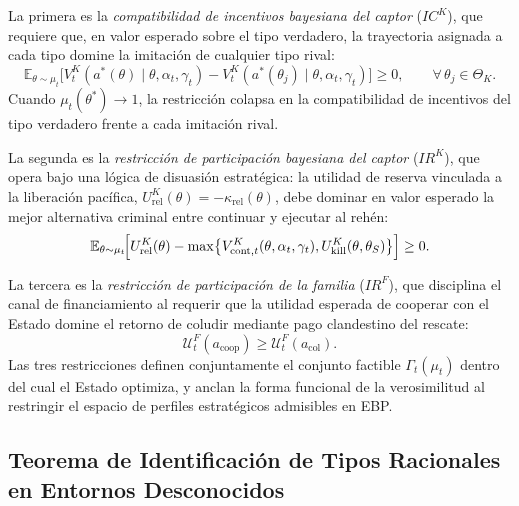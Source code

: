 \documentclass[pdflatex,sn-mathphys-ay]{sn-jnl}
\theoremstyle{thmstyleone}
\theoremstyle{thmstyletwo}
\theoremstyle{thmstylethree}
\newcommand{\E}{\mathbb{E}}
\newcommand{\ThetaK}{\Theta_K}
\newcommand{\1}{\mathbf{1}}
\begin{document}
La primera es la \emph{compatibilidad de incentivos bayesiana del captor} ($IC^K$), que requiere que, en valor esperado sobre el tipo verdadero, la trayectoria asignada a cada tipo domine la imitación de cualquier tipo rival:
\begin{equation}
\E_{\theta\sim\mu_t}\!\bigl[V^K_t(a^\ast(\theta)\mid\theta,\alpha_t,\gamma_t)-V^K_t(a^\ast(\theta_j)\mid\theta,\alpha_t,\gamma_t)\bigr]\ge 0,\qquad\forall\,\theta_j\in\ThetaK.
\label{eq:ic-kidnapper}
\end{equation}
Cuando $\mu_t(\theta^\ast)\to 1$, la restricción colapsa en la compatibilidad de incentivos del tipo verdadero frente a cada imitación rival.

La segunda es la \emph{restricción de participación bayesiana del captor} ($IR^K$), que opera bajo una lógica de disuasión estratégica: la utilidad de reserva vinculada a la liberación pacífica, $U^K_{\mathrm{rel}}(\theta)=-\kappa_{\mathrm{rel}}(\theta)$, debe dominar en valor esperado la mejor alternativa criminal entre continuar y ejecutar al rehén:
\begin{equation}
\E_{\theta\sim\mu_t}\!\Bigl[U^K_{\mathrm{rel}}(\theta)-\max\bigl\{V^K_{\mathrm{cont},t}(\theta,\alpha_t,\gamma_t),U^K_{\mathrm{kill}}(\theta,\theta_S)\bigr\}\Bigr]\ge 0.
\label{eq:ir-K}
\end{equation}

La tercera es la \emph{restricción de participación de la familia} ($IR^F$), que disciplina el canal de financiamiento al requerir que la utilidad esperada de cooperar con el Estado domine el retorno de coludir mediante pago clandestino del rescate:
\begin{equation}
\mathcal{U}^F_t(a_{\mathrm{coop}})\ge\mathcal{U}^F_t(a_{\mathrm{col}}).
\label{eq:ir-family}
\end{equation}
Las tres restricciones definen conjuntamente el conjunto factible $\Gamma_t(\mu_t)$ dentro del cual el Estado optimiza, y anclan la forma funcional de la verosimilitud al restringir el espacio de perfiles estratégicos admisibles en EBP.

\subsection{Teorema de Identificación de Tipos Racionales en Entornos Desconocidos}\label{subsec:formal-defs}
\end{document}
